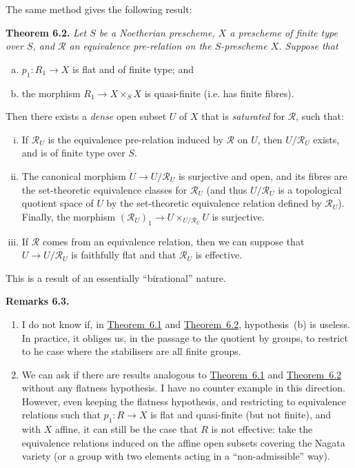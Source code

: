 \documentclass{article}
\newenvironment{itenv}[1]
  {\phantomsection\par\medskip\noindent\textbf{#1.}\itshape}
  {\medskip}
\newenvironment{rmenv}[1]
  {\phantomsection\par\medskip\noindent\textbf{#1.}\rmfamily}
  {\medskip}
\renewcommand{\cal}[1]{{\mathcal{#1}}}
\newcommand{\oldpage}[1]{\marginpar{\footnotesize$\Big\vert$ \textit{p.~#1}}}
\begin{document}
The same method gives the following result:

\begin{itenv}{Theorem 6.2}
\label{theorem6.2}
  Let $S$ be a Noetherian prescheme, $X$ a prescheme of finite type over $S$, and $\cal{R}$ an equivalence pre-relation on the $S$-prescheme $X$.
  Suppose that
  \begin{enumerate}[(a)]
    \item $p_1\colon R_1\to X$ is flat and of finite type; and
    \item the morphism $R_1\to X\times_S X$ is quasi-finite (i.e. has finite fibres).
  \end{enumerate}
  Then there exists a \emph{dense} open subset $U$ of $X$ that is \emph{saturated} for $\cal{R}$, such that:
  \begin{enumerate}[(i)]
    \item If $\cal{R}_U$ is the equivalence pre-relation induced by $\cal{R}$ on $U$, then $U/\cal{R}_U$ exists, and is of finite type over $S$.
    \item The canonical morphism $U\to U/\cal{R}_U$ is surjective and open, and its fibres are the set-theoretic equivalence classes for $\cal{R}_U$ (and thus $U/\cal{R}_U$ is a topological quotient space of $U$ by the set-theoretic equivalence relation defined by $\cal{R}_U$).
      Finally, the morphism $(\cal{R}_U)_1\to U\times_{U/\cal{R}_U}U$ is surjective.
\oldpage{212-16}
    \item If $\cal{R}$ comes from an equivalence relation, then we can suppose that $U\to U/\cal{R}_U$ is faithfully flat and that $\cal{R}_U$ is effective.
  \end{enumerate}
\end{itenv}

This is a result of an essentially ``birational'' nature.

\begin{rmenv}{Remarks 6.3}
  \begin{enumerate}
    \item I do not know if, in \hyperref[theorem6.1]{Theorem~6.1} and \hyperref[theorem6.2]{Theorem~6.2}, hypothesis~(b) is useless.
      In practice, it obliges us, in the passage to the quotient by groups, to restrict to he case where the stabilisers are all finite groups.
    \item We can ask if there are results analogous to \hyperref[theorem6.1]{Theorem~6.1} and \hyperref[theorem6.2]{Theorem~6.2} without any flatness hypothesis.
      I have no counter example in this direction.
      However, even keeping the flatness hypothesis, and restricting to equivalence relations such that $p_1\colon R\to X$ is flat and quasi-finite (but not finite), and with $X$ affine, it can still be the case that $R$ is not effective: take the equivalence relations induced on the affine open subsets covering the Nagata variety (or a group with two elements acting in a ``non-admissible'' way).
  \end{enumerate}
\end{rmenv}
\end{document}
